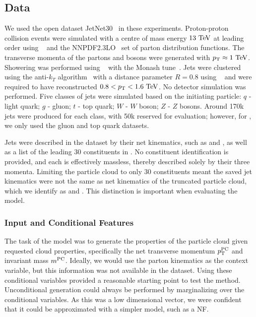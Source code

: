 \subsection{Data}
\label{sec:jetgen_data}

We used the open dataset JetNet30~\cite{MPGAN} in these experiments.
Proton-proton collision events were simulated with a centre of mass energy $13~\TeV$ at leading order using \madgraph~\cite{MadGraph} and the \textsc{NNPDF2.3LO}~\cite{PDF2.3} set of parton distribution functions.
The transverse momenta of the partons and bosons were generated with $\pt \approx 1~\TeV$.
Showering was performed using ~\cite{Pythia8} with the Monash tune~\cite{Monash}.
Jets were clustered using the anti-$k_T$ algorithm~\cite{AntiKt} with a distance parameter $R=0.8$ using \fastjet~\cite{FastJet} and were required to have reconstructed $0.8 < \pt < 1.6~\TeV$.
No detector simulation was performed.
Five classes of jets were simulated based on the initiating particle: $q$ - light quark; $g$ - gluon; $t$ - top quark; $W$ - $W$ boson; $Z$ - $Z$ bosons.
Around 170k jets were produced for each class, with 50k reserved for evaluation; however, for \pcjedi, we only used the gluon and top quark datasets.

Jets were described in the dataset by their net kinematics, such as \mjet and \ptjet, as well as a list of the leading 30 constituents in \pt.
No constituent identification is provided, and each is effectively massless, thereby described solely by their three momenta.
Limiting the particle cloud to only 30 constituents meant the saved jet kinematics were not the same as net kinematics of the truncated particle cloud, which we identify as \mpc and \ptpc.
This distinction is important when evaluating the model.

\subsubsection{Input and Conditional Features}

The task of the model was to generate the properties of the particle cloud given requested cloud properties, specifically the net transverse momentum $p_\mathrm{T}^{\text{PC}}$ and invariant mass $m^{\text{PC}}$.
Ideally, we would use the parton kinematics as the context variable, but this information was not available in the dataset.
Using these conditional variables provided a reasonable starting point to test the method.
Unconditional generation could always be performed by marginalizing over the conditional variables.
As this was a low dimensional vector, we were confident that it could be approximated with a simpler model, such as a NF.


